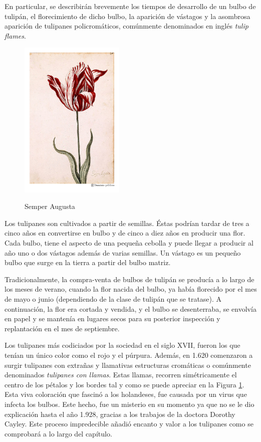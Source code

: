 En particular, se describirán brevemente los tiempos de desarrollo de un bulbo de tulipán, el florecimiento de dicho bulbo, la aparición de vástagos y la asombrosa aparición de tulipanes policromáticos, comúnmente denominados en inglés \emph{tulip flames}. 

\begin{figure}[!h] 
\caption{Semper Augusta} 
\centering \includegraphics[width=50mm]{capitulos/img/semperAugustus} 
\label{fig:semperAugustus} 
\end{figure}

Los tulipanes son cultivados a partir de semillas. Éstas podrían tardar de tres a cinco años en convertirse en bulbo y de cinco a diez años en producir una flor. Cada bulbo, tiene el aspecto de una pequeña cebolla y puede llegar a producir al año uno o dos vástagos además de varias semillas. Un vástago es un pequeño bulbo que surge en la tierra a partir del bulbo matriz.

Tradicionalmente, la compra-venta de bulbos de tulipán se producía a lo largo de los meses de verano, cuando la flor nacida del bulbo, ya había florecido por el mes de mayo o junio (dependiendo de la clase de tulipán que se tratase). A continuación, la flor era cortada y vendida, y el bulbo se desenterraba, se envolvía en papel y se mantenía en lugares secos para su posterior inspección y replantación en el mes de septiembre.

Los tulipanes más codiciados por la sociedad en el siglo XVII, fueron los que tenían un único color como el rojo y el púrpura. Además, en 1.620 comenzaron a surgir tulipanes con extrañas y llamativas estructuras cromáticas o comúnmente denominados \emph{tulipanes con llamas}. Estas llamas, recorren simétricamente el centro de los pétalos y los bordes tal y como se puede apreciar en la Figura \ref{fig:semperAugustus}. Esta viva coloración que fascinó a los holandeses, fue causada por un virus que infecta los bulbos. Este hecho, fue un misterio en su momento ya que no se le dio explicación hasta el año 1.928, gracias a los trabajos de la doctora Dorothy Cayley. Este proceso impredecible añadió encanto y valor a los tulipanes como se comprobará a lo largo del capítulo.

